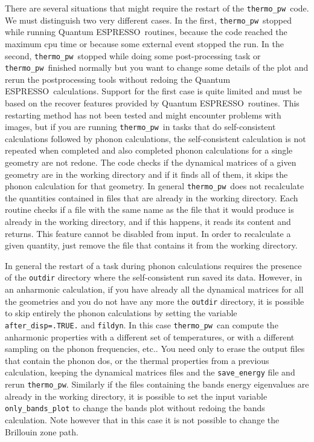 \documentclass[12pt,a4paper]{article}
\def\qe{{\sc Quantum ESPRESSO}}
\def\thermo{\texttt{thermo\_pw}}
\begin{document}
There are several situations that might require the restart of the \thermo\ 
code. We must distinguish two very different cases. In the first,
\thermo\ stopped while running \qe\ routines, because the code reached
the maximum cpu time or because some external event stopped the run.
In the second, \thermo\ stopped while doing some post-processing 
task or \thermo\ finished normally but you want to change 
some details of the plot and rerun the postprocessing 
tools without redoing the \qe\ calculations.
Support for the first case is quite limited and must be based on the
recover features provided by \qe\ routines. This restarting method has
not been tested and might encounter problems with images, but if you are 
running \thermo\ in tasks that do self-consistent calculations followed 
by phonon calculations, the self-consistent calculation is not repeated 
when completed and also completed phonon calculations for a single geometry are
not redone. The code checks if the dynamical matrices of a given
geometry are in the working directory and if it finds all of them, it skips the
phonon calculation for that geometry.
In general \thermo\ does not 
recalculate the quantities contained in files that are already in the working
directory. Each routine checks if a file with the same name
as the file that it would produce is already in the working directory,
and if this happens, it reads its content and returns. This feature cannot be
disabled from input. In order to recalculate a given quantity, just remove
the file that contains it from the working directory.

In general the restart of a task during phonon calculations
requires the presence of the \texttt{outdir} directory
where the self-consistent run saved its data. 
However, in an anharmonic calculation, if you have already all the dynamical 
matrices for all the geometries and you do not have any more the
\texttt{outdir} directory, it is possible to skip entirely
the phonon calculations by setting the variable 
\texttt{after\_disp=.TRUE.} and \texttt{fildyn}. In this case 
\thermo\ can compute the anharmonic properties with a different set 
of temperatures, or with a different sampling on the phonon frequencies, 
etc.. You need only to erase the output files that contain
the phonon dos, or the thermal properties from a previous calculation, keeping 
the dynamical matrices files and the \texttt{save\_energy} file
and rerun \thermo.
Similarly if the files containing the bands energy eigenvalues are already
in the working directory, it is possible to set the input variable
\texttt{only\_bands\_plot} to change the bands plot without redoing the
bands calculation. Note however that in this case it is not possible 
to change the Brillouin zone path.
\end{document}
